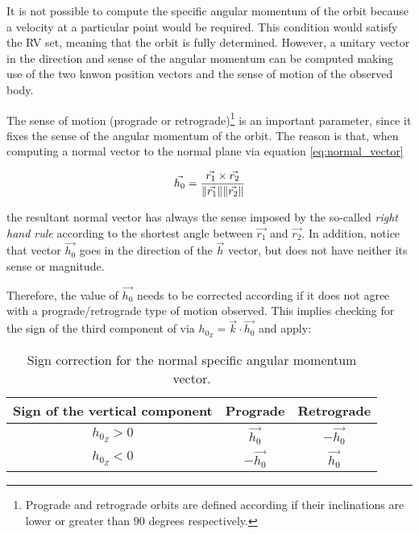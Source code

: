 It is not possible to compute the specific angular momentum of the orbit because
a velocity at a particular point would be required. This condition would satisfy
the RV set, meaning that the orbit is fully determined. However, a unitary
vector in the direction and sense of the angular momentum can be computed making
use of the two knwon position vectors and the sense of motion of the observed
body.

The sense of motion (prograde or retrograde)\footnote{Prograde and retrograde
  orbits are defined according if their inclinations are lower or greater than
  $90$ degrees respectively.} is an important parameter, since it fixes the sense
of the angular momentum of the orbit. The reason is that, when computing a
normal vector to the normal plane via equation \ref{eq:normal_vector}

\begin{equation}
  \vec{h_{0}} = \frac{\vec{r_{1}} \times \vec{r_{2}}}{\lVert\vec{r_{1}}\rVert\lVert\vec{r_{2}}\rVert}
  \label{eq:normal_vector}
\end{equation}

the resultant normal vector has always the sense imposed by the so-called
\textit{right hand rule} according to the shortest angle between $\vec{r_{1}}$
and $\vec{r_{2}}$. In addition, notice that vector $\vec{h_{0}}$ goes in the
direction of the $\vec{h}$ vector, but does not have neither its sense or
magnitude.

Therefore, the value of $\vec{h_{0}}$ needs to be corrected according if it does
not agree with a prograde/retrograde type of motion observed. This implies
checking for the sign of the third component of via $h_{0_{Z}} =
  \vec{k} \cdot \vec{h_{0}}$ and apply:

\vspace{0.15cm}
\bgroup
\def\arraystretch{1.5}
\begin{table}[H]
  \centering
  \begin{tabular}{|c|c|c|}
    \hline
    \textbf{Sign of the vertical component} & \textbf{Prograde} & \textbf{Retrograde} \\ \hline
    $h_{0_{Z}} > 0$                         & $\vec{h_{0}}$     & $-\vec{h_{0}}$      \\ \hline
    $h_{0_{Z}} < 0$                         & $-\vec{h_{0}}$    & $\vec{h_{0}}$       \\ \hline
  \end{tabular}
  \caption{Sign correction for the normal specific angular momentum vector.}
\end{table}
\egroup

